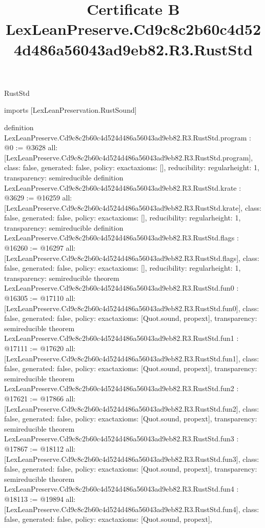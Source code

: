 \begin{lexlean}{RustStd}
\title{Certificate B LexLeanPreserve.Cd9c8c2b60c4d524d486a56043ad9eb82.R3.RustStd}
\begin{coremodule}
imports [LexLeanPreservation.RustSound]

definition LexLeanPreserve.Cd9c8c2b60c4d524d486a56043ad9eb82.R3.RustStd.program : @0 := @3628 {
  all: [LexLeanPreserve.Cd9c8c2b60c4d524d486a56043ad9eb82.R3.RustStd.program],
  class: false,
  generated: false,
  policy: exact{axioms: []},
  reducibility: regular{height: 1},
  transparency: semireducible
}
definition LexLeanPreserve.Cd9c8c2b60c4d524d486a56043ad9eb82.R3.RustStd.krate : @3629 := @16259 {
  all: [LexLeanPreserve.Cd9c8c2b60c4d524d486a56043ad9eb82.R3.RustStd.krate],
  class: false,
  generated: false,
  policy: exact{axioms: []},
  reducibility: regular{height: 1},
  transparency: semireducible
}
definition LexLeanPreserve.Cd9c8c2b60c4d524d486a56043ad9eb82.R3.RustStd.flags : @16260 := @16297 {
  all: [LexLeanPreserve.Cd9c8c2b60c4d524d486a56043ad9eb82.R3.RustStd.flags],
  class: false,
  generated: false,
  policy: exact{axioms: []},
  reducibility: regular{height: 1},
  transparency: semireducible
}
theorem LexLeanPreserve.Cd9c8c2b60c4d524d486a56043ad9eb82.R3.RustStd.fun0 : @16305 := @17110 {
  all: [LexLeanPreserve.Cd9c8c2b60c4d524d486a56043ad9eb82.R3.RustStd.fun0],
  class: false,
  generated: false,
  policy: exact{axioms: [Quot.sound, propext]},
  transparency: semireducible
}
theorem LexLeanPreserve.Cd9c8c2b60c4d524d486a56043ad9eb82.R3.RustStd.fun1 : @17111 := @17620 {
  all: [LexLeanPreserve.Cd9c8c2b60c4d524d486a56043ad9eb82.R3.RustStd.fun1],
  class: false,
  generated: false,
  policy: exact{axioms: [Quot.sound, propext]},
  transparency: semireducible
}
theorem LexLeanPreserve.Cd9c8c2b60c4d524d486a56043ad9eb82.R3.RustStd.fun2 : @17621 := @17866 {
  all: [LexLeanPreserve.Cd9c8c2b60c4d524d486a56043ad9eb82.R3.RustStd.fun2],
  class: false,
  generated: false,
  policy: exact{axioms: [Quot.sound, propext]},
  transparency: semireducible
}
theorem LexLeanPreserve.Cd9c8c2b60c4d524d486a56043ad9eb82.R3.RustStd.fun3 : @17867 := @18112 {
  all: [LexLeanPreserve.Cd9c8c2b60c4d524d486a56043ad9eb82.R3.RustStd.fun3],
  class: false,
  generated: false,
  policy: exact{axioms: [Quot.sound, propext]},
  transparency: semireducible
}
theorem LexLeanPreserve.Cd9c8c2b60c4d524d486a56043ad9eb82.R3.RustStd.fun4 : @18113 := @19894 {
  all: [LexLeanPreserve.Cd9c8c2b60c4d524d486a56043ad9eb82.R3.RustStd.fun4],
  class: false,
  generated: false,
  policy: exact{axioms: [Quot.sound, propext]},
}
\end{coremodule}
\end{lexlean}
